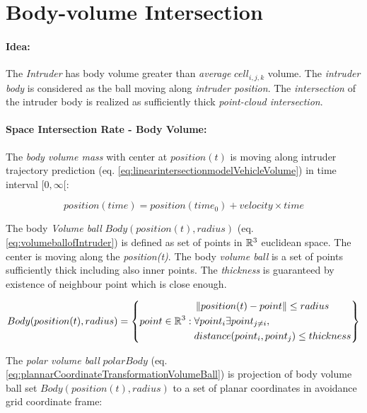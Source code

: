 \newpage
\section{Body-volume Intersection}\label{s:bodyvolumeIntersection}
\paragraph{Idea:} The \emph{Intruder} has \empty body volume greater than \emph{average} $cell_{i,j,k}$ volume. The \emph{intruder body} is considered as the ball moving along \emph{intruder position}. The \emph{intersection} of the intruder body is realized as sufficiently thick \emph{point-cloud intersection}.

\paragraph{Space Intersection Rate - Body Volume:} The \emph{body volume mass} with center at $position(t)$ is moving along intruder trajectory prediction (eq. \ref{eq:linearintersectionmodelVehicleVolume}) in time interval $[0,\infty[$:

\begin{equation}\label{eq:linearintersectionmodelVehicleVolume}
    position(time) = position(time_0) + velocity \times time
\end{equation}

\noindent The body \emph{Volume ball} $Body(position(t),radius)$ (eq. \ref{eq:volumeballofIntruder}) is defined as set of points in $\mathbb{R}^3$ euclidean space. The center is moving along the \emph{position(t)}. The body \emph{volume ball} is a set of points sufficiently thick including also inner points. The \emph{thickness} is guaranteed by existence of neighbour point which is close enough.

\begin{equation}\label{eq:volumeballofIntruder}
    Body(position(t),radius) = \left\{point \in \mathbb{R}^3:\begin{aligned}&\left\lVert position(t) - point\right\rVert \le radius\\ &\forall point_i \exists point_{j\neq i},\\ &distance(point_i,point_j)\le thickness\end{aligned} \right\}
\end{equation}

\noindent The \emph{polar volume ball} $polarBody$ (eq. \ref{eq:plannarCoordinateTransformationVolumeBall}) is projection of body volume ball  set $Body(position(t),radius)$ to a set of planar coordinates in avoidance grid coordinate frame:

